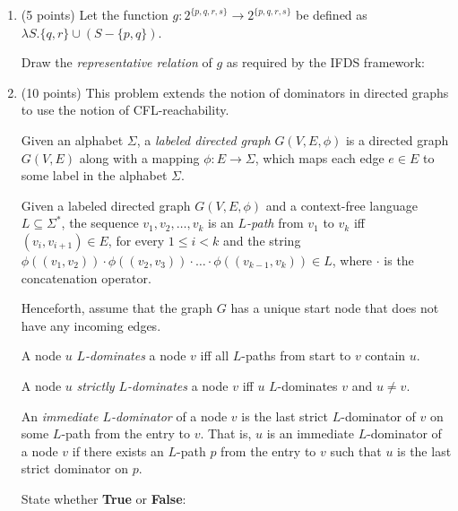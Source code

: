 \documentclass[12pt]{article}
\begin{document}
\begin{enumerate}
\begin{mdframed}
      \end{mdframed}

      \item (5 points) Let the function $g: 2^{\{p,q,r, s\}} \rightarrow 2^{\{p,q,r,s\}}$ be defined 
      as $\lambda S. \{q, r\} \cup (S - \{p, q \})$. 
    
      Draw the \emph{representative relation} of $g$ as required by the IFDS framework:
    
      \begin{mdframed}
        \vspace{5em}
        
      \end{mdframed}

      \clearpage
      \item (10 points) This problem extends the notion of dominators in
      directed graphs to use the notion of CFL-reachability.

      Given an alphabet $\Sigma$, a \emph{labeled directed graph} $G(V, E, \phi)$ is a
      directed graph $G(V, E)$  along with a mapping $\phi \colon E \to \Sigma$,
      which maps each edge $e\in E$ to some label in the alphabet $\Sigma$. 

      Given a labeled directed graph $G(V, E, \phi)$ and a context-free language
      $L \subseteq \Sigma^*$, the sequence $v_1, v_2, \ldots, v_k$ is an
      \emph{$L$-path} from $v_1$ to $v_k$ iff $(v_i,v_{i+1}) \in E$, for every
      $1\leq i < k$ and the string $\phi((v_1, v_2)) \cdot \phi((v_2, v_3)) \cdot \ldots \cdot
      \phi((v_{k-1},v_k)) \in L$, where $\cdot$ is the concatenation operator. 

      Henceforth, assume that the graph $G$ has a unique start node that does
      not have any incoming edges. 

      A node $u$ \emph{$L$-dominates} a node $v$ iff all $L$-paths from start to 
      $v$ contain $u$. 

      A node $u$ \emph{strictly $L$-dominates} a node $v$ iff $u$ $L$-dominates $v$ 
      and $u \neq v$. 

      An \emph{immediate $L$-dominator} of a node $v$ is the last strict
      $L$-dominator of $v$ on some $L$-path from the entry to $v$. That is, $u$
      is an immediate $L$-dominator of a node $v$ if there exists an $L$-path
      $p$ from the entry to $v$ such that $u$ is the last strict dominator on
      $p$.

      State whether \textbf{True} or \textbf{False}: 
    

\end{enumerate}
\end{document}
